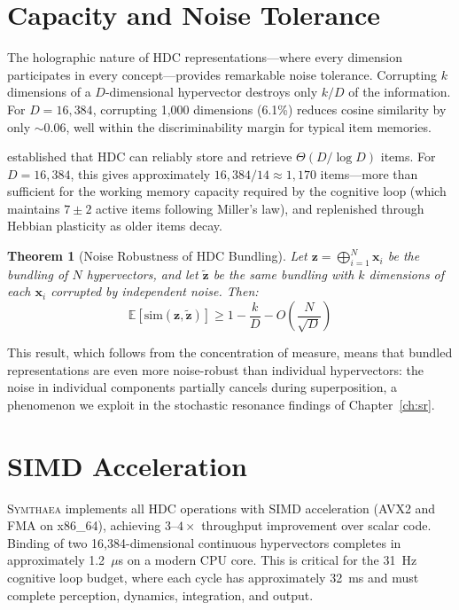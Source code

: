 \documentclass[12pt]{book}
\newtheorem{theorem}{Theorem}[chapter]
\newcommand{\symthaea}{\textsc{Symthaea}}
\newcommand{\E}{\mathbb{E}}
\begin{document}
\section{Capacity and Noise Tolerance}

The holographic nature of HDC representations---where every dimension participates in every concept---provides remarkable noise tolerance. Corrupting $k$ dimensions of a $D$-dimensional hypervector destroys only $k/D$ of the information. For $D = 16{,}384$, corrupting 1,000 dimensions (6.1\%) reduces cosine similarity by only $\sim$0.06, well within the discriminability margin for typical item memories.

\citet{thomas2021theoretical} established that HDC can reliably store and retrieve $\Theta(D / \log D)$ items. For $D = 16{,}384$, this gives approximately $16{,}384 / 14 \approx 1{,}170$ items---more than sufficient for the working memory capacity required by the cognitive loop (which maintains $7 \pm 2$ active items following Miller's law), and replenished through Hebbian plasticity as older items decay.

\begin{theorem}[Noise Robustness of HDC Bundling]
Let $\mathbf{z} = \bigoplus_{i=1}^{N} \mathbf{x}_i$ be the bundling of $N$ hypervectors, and let $\tilde{\mathbf{z}}$ be the same bundling with $k$ dimensions of each $\mathbf{x}_i$ corrupted by independent noise. Then:
\begin{equation}
\E[\text{sim}(\mathbf{z}, \tilde{\mathbf{z}})] \geq 1 - \frac{k}{D} - O\!\left(\frac{N}{\sqrt{D}}\right)
\end{equation}
\end{theorem}

This result, which follows from the concentration of measure, means that bundled representations are even more noise-robust than individual hypervectors: the noise in individual components partially cancels during superposition, a phenomenon we exploit in the stochastic resonance findings of Chapter~\ref{ch:sr}.

\section{SIMD Acceleration}

\symthaea{} implements all HDC operations with SIMD acceleration (AVX2 and FMA on x86\_64), achieving $3$--$4\times$ throughput improvement over scalar code. Binding of two 16,384-dimensional continuous hypervectors completes in approximately 1.2~$\mu$s on a modern CPU core. This is critical for the 31~Hz cognitive loop budget, where each cycle has approximately 32~ms and must complete perception, dynamics, integration, and output.
\end{document}

